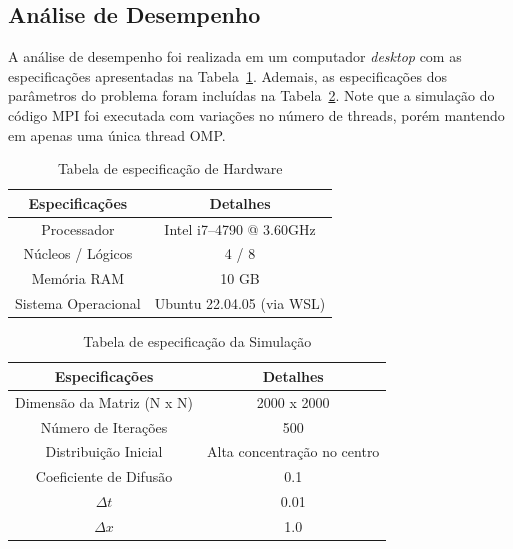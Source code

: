 \documentclass[12pt]{article}
\begin{document}
\subsection{Análise de Desempenho}

A análise de desempenho foi realizada em um computador \textit{desktop} com as
especificações apresentadas na Tabela~\ref{tab:especificacaoHardware}. Ademais,
as especificações dos parâmetros do problema foram incluídas na
Tabela~\ref{tab:especificacaoSimulacao}. Note que a simulação do código MPI foi
executada com variações no número de threads, porém mantendo em apenas uma
única thread OMP.

\begin{table}[ht]
  \centering
  \caption{Tabela de especificação de Hardware}
  \vspace{0.3cm}
  \begin{tabular}{||c c||}
    \hline
    Especificações      & Detalhes                  \\ [0.5ex]
    \hline\hline
    Processador         & Intel i7--4790 @ 3.60GHz  \\
    \hline
    Núcleos / Lógicos   & 4 / 8                     \\
    \hline
    Memória RAM         & 10 GB                     \\
    \hline
    Sistema Operacional & Ubuntu 22.04.05 (via WSL) \\
    \hline
  \end{tabular}
  \label{tab:especificacaoHardware}
\end{table}

\begin{table}[ht]
  \centering
  \caption{Tabela de especificação da Simulação}\label{tab:especificacaoSimulacao}
  \vspace{0.3cm}
  \begin{tabular}{||c c||}
    \hline
    Especificações             & Detalhes                    \\ [0.5ex]
    \hline\hline
    Dimensão da Matriz (N x N) & 2000 x 2000                 \\
    \hline
    Número de Iterações        & 500                         \\
    \hline
    Distribuição Inicial       & Alta concentração no centro \\
    \hline
    Coeficiente de Difusão     & 0.1                         \\
    \hline
    $\Delta t$                 & 0.01                        \\
    \hline
    $\Delta x$                 & 1.0                         \\
    \hline
  \end{tabular}
\end{table}
\end{document}
